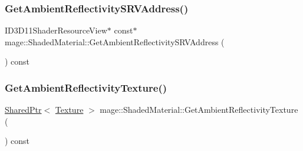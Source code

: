 \hypertarget{structmage_1_1_shaded_material_a854b166ed33ab748910d98a0ea6bd4d1}{}\label{structmage_1_1_shaded_material_a854b166ed33ab748910d98a0ea6bd4d1} 
\subsubsection{\texorpdfstring{Get\+Ambient\+Reflectivity\+S\+R\+V\+Address()}{GetAmbientReflectivitySRVAddress()}}
{\footnotesize\ttfamily I\+D3\+D11\+Shader\+Resource\+View$\ast$ const$\ast$ mage\+::\+Shaded\+Material\+::\+Get\+Ambient\+Reflectivity\+S\+R\+V\+Address (\begin{DoxyParamCaption}{ }\end{DoxyParamCaption}) const\hspace{0.3cm}{\ttfamily [noexcept]}}

\hypertarget{structmage_1_1_shaded_material_a66be8b4fbb028b41483f8a9e044e5023}{}\label{structmage_1_1_shaded_material_a66be8b4fbb028b41483f8a9e044e5023} 
\subsubsection{\texorpdfstring{Get\+Ambient\+Reflectivity\+Texture()}{GetAmbientReflectivityTexture()}}
{\footnotesize\ttfamily \hyperlink{namespacemage_a1e01ae66713838a7a67d30e44c67703e}{Shared\+Ptr}$<$ \hyperlink{classmage_1_1_texture}{Texture} $>$ mage\+::\+Shaded\+Material\+::\+Get\+Ambient\+Reflectivity\+Texture (\begin{DoxyParamCaption}{ }\end{DoxyParamCaption}) const\hspace{0.3cm}{\ttfamily [noexcept]}}

\hypertarget{structmage_1_1_shaded_material_ad16addcaa9b32b7a9d5ce793d55b1b2c}{}\label{structmage_1_1_shaded_material_ad16addcaa9b32b7a9d5ce793d55b1b2c} 
